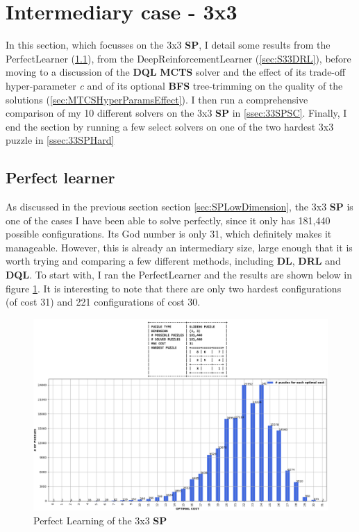 \section{Intermediary case - 3x3}
\label{sec:S33}

In this section, which focusses on the 3x3 \textbf{SP}, I detail some results from the PerfectLearner (\ref{sec:S33PL}), from the DeepReinforcementLearner (\ref{sec:S33DRL}), before moving to a discussion of the \textbf{DQL} \textbf{MCTS} solver and the effect of its trade-off hyper-parameter \textit{c} and of its optional \textbf{BFS} tree-trimming on the quality of the solutions (\ref{sec:MTCSHyperParamsEffect}). I then run a comprehensive comparison of my 10 different solvers on the 3x3 \textbf{SP} in \ref{ssec:33SPSC}. Finally, I end the section by running a few select solvers on one of the two hardest 3x3 puzzle in \ref{ssec:33SPHard}


\subsection{Perfect learner}
\label{sec:S33PL}
As discussed in the previous section section \ref{sec:SPLowDimension}, the 3x3 \textbf{SP} is one of the cases I have been able to solve perfectly, since it only has 181,440 possible configurations. Its God number is only 31, which definitely makes it manageable. However, this is already an intermediary size, large enough that it is worth trying and comparing a few different methods, including \textbf{DL}, \textbf{DRL} and \textbf{DQL}. To start with, I ran the PerfectLearner and the results are shown below in figure \ref{fig:33SPPerfectLearning}. It is interesting to note that there are only two hardest configurations (of cost 31) and 221 configurations of cost 30.


\begin{figure}[H]
\centering
\includegraphics[scale=0.42]{./Figures/33SPPerfectLearning}
\caption[33SPPerfectLearning]{Perfect Learning of the 3x3 \textbf{SP}}
\label{fig:33SPPerfectLearning}
\end{figure}




